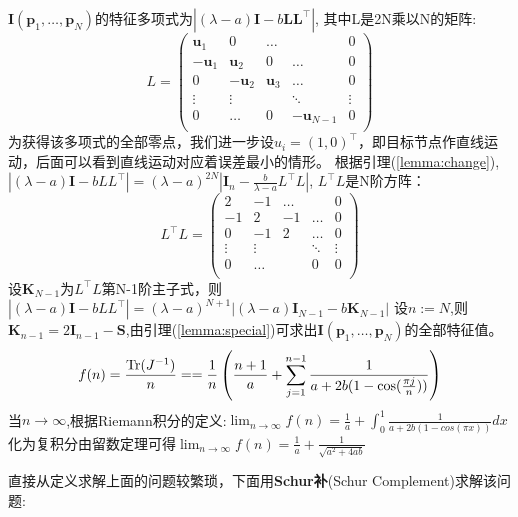 $\bm{I}(\bm{p}_1,\dots,\bm{p}_N)$的特征多项式为$|(\lambda-a)\bm{I}-b\bm{L}\bm{L}^\intercal |$,
其中L是2N乘以N的矩阵:
\[
L=\left(
\begin{array}{ccccc}
\bm{u}_1&0&\dots&&0\\
-\bm{u}_1&\bm{u}_2&0&\dots&0\\
0&-\bm{u}_2&\bm{u}_3&\dots&0\\
\vdots &\vdots&&\ddots &\vdots\\
0&\dots&0&-\bm{u}_{N-1}&0\\
\end{array}
\right)
\]
为获得该多项式的全部零点，我们进一步设$u_i=(1,0)^\intercal $，即目标节点作直线运动，后面可以看到直线运动对应着误差最小的情形。
根据引理(\ref{lemma:change}),$|(\lambda-a)\bm{I}-bLL^\intercal |=(\lambda-a)^{2N}|\bm{I}_n-\frac{b}{\lambda-a}L^\intercal L|$,
$L^\intercal L$是N阶方阵：
\[
L^\intercal L=\left(
\begin{array}{ccccc}
2&-1&\dots&&0\\
-1&2&-1&\dots&0\\
0&-1&2&\dots&0\\
\vdots &\vdots&&\ddots &\vdots\\
0&\dots&&0&0\\
\end{array}
\right)
\]
设$\bm{K}_{N-1}$为$L^\intercal L$第N-1阶主子式，则
$|(\lambda-a)\bm{I}-bLL^\intercal |=(\lambda-a)^{N+1}|(\lambda-a)\bm{I}_{N-1}-b\bm{K}_{N-1}|$
设$n:=N$,则$\bm{K}_{n-1}=2\bm{I}_{n-1}-\bm{S}$,由引理(\ref{lemma:special})可求出$\bm{I}(\bm{p}_1,\dots,\bm{p}_N)$的全部特征值。
\[
f(n)=\frac{\operatorname{Tr}(J^{-1})}{n}==\frac{1}{n}\left(\frac{n+1}{a}+\sum_{j=1}^{n-1}\frac{1}{a+2b(1-\cos(\frac{\pi j}{n}))}\right)
\]
当$n\to \infty$,根据Riemann积分的定义:$\lim_{n\rightarrow \infty}f(n)=\frac{1}{a}+\int_0^1 \frac{1}{a+2b(1-cos(\pi x))}dx$
化为复积分由留数定理可得$\lim_{n\rightarrow \infty}f(n)=\frac{1}{a}+\frac{1}{\sqrt{a^2+4ab}}$

直接从定义求解上面的问题较繁琐，下面用\textbf{Schur补}(Schur Complement)求解该问题:

